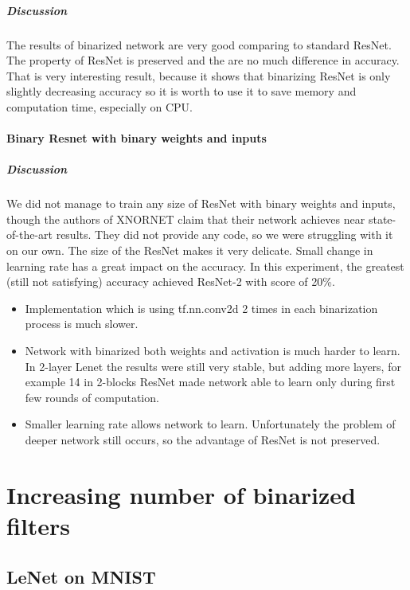 \documentclass[licencjacka]{pracamgr}
\begin{document}
		        \paragraph{Discussion} 

		        The results of binarized network are very good comparing to standard ResNet. The property of ResNet is preserved and the are no much difference in accuracy. That is very interesting result, because it shows that binarizing ResNet is only slightly decreasing accuracy so it is worth to use it to save memory and computation time, especially on CPU.

			\subsubsection{Binary Resnet with binary weights and inputs}
			        \paragraph{Discussion} 
				We did not manage to train any size of ResNet with binary weights and inputs, though the authors of XNORNET claim that their network achieves near state-of-the-art results. They did not provide any code, so we were struggling with it on our own. The size of the ResNet makes it very delicate. Small change in learning rate has a great impact on the accuracy. In this experiment, the greatest (still not satisfying) accuracy achieved ResNet-2 with score of 20\%. 
			        \begin{itemize}
			                \item Implementation which is using tf.nn.conv2d 2 times in each binarization process is much slower. 
			                \item Network with binarized both weights and activation is much harder to learn. In 2-layer Lenet the results were still very stable, but adding more layers, for example 14 in 2-blocks ResNet made network able to learn only during first few rounds of computation.
			                \item Smaller learning rate allows network to learn. Unfortunately the problem of deeper network still occurs, so the advantage of ResNet is not preserved.
			        \end{itemize}
\chapter{Increasing number of binarized filters}
	\section{LeNet on MNIST}
\end{document}

